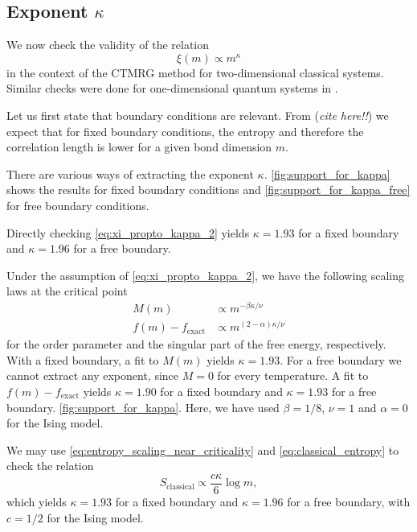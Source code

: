 \subsection{Exponent $\kappa$}

We now check the validity of the relation
\begin{equation}\label{eq:xi_propto_kappa_2}
  \xi(m) \propto m^{\kappa}
\end{equation}
in the context of the CTMRG method for two-dimensional
classical systems. Similar checks were done for one-dimensional quantum systems in \cite{tagliacozzo2008scaling}.

Let us first state that boundary conditions are relevant.
From (\emph{cite here!!}) we expect that for fixed boundary conditions,
the entropy and therefore the correlation length is lower for a given bond dimension $m$.

There are various ways of extracting the exponent $\kappa$.
\autoref{fig:support_for_kappa} shows the results for fixed boundary conditions and \autoref{fig:support_for_kappa_free}
for free boundary conditions.

Directly checking \autoref{eq:xi_propto_kappa_2} yields $\kappa = 1.93$ for a fixed boundary
and $\kappa = 1.96$ for a free boundary.

Under the assumption of \autoref{eq:xi_propto_kappa_2}, we have the following scaling laws at the critical point
\begin{align}\label{eq:scaling_laws_order_param_free_energy_kappa}
  M(m) & \propto m^{-\beta \kappa / \nu} \\
  f(m) - f_{\text{exact}} & \propto m^{(2-\alpha)\kappa / \nu}
\end{align}
for the order parameter and the singular part of the free energy, respectively.
With a fixed boundary, a fit to $M(m)$ yields $\kappa = 1.93$.
For a free boundary we cannot extract any exponent, since $M = 0$ for every temperature.
A fit to $f(m) - f_{\text{exact}}$ yields $\kappa = 1.90$ for a fixed boundary and $\kappa = 1.93$ for a free boundary.
\autoref{fig:support_for_kappa}. Here, we have used $\beta = 1/8$, $\nu = 1$ and $\alpha = 0$ for the Ising model.

We may use \autoref{eq:entropy_scaling_near_criticality} and \autoref{eq:classical_entropy} to check the
relation
\begin{equation}\label{eq:scaling_law_entropy_kappa}
  S_{\text{classical}} \propto \frac{c\kappa}{6}\log m,
\end{equation}
which yields $\kappa = 1.93$ for a fixed boundary and $\kappa = 1.96$ for a free boundary,
with $c = 1/2$ for the Ising model.

